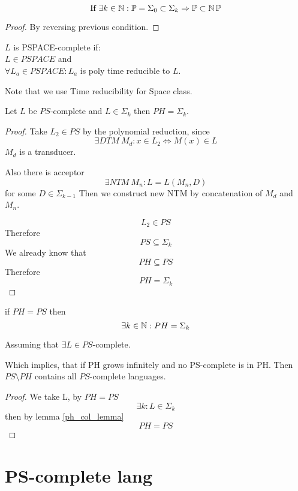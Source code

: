 \begin{consequence}
	\[ \text{If}\ \exists k \in \operatorname{\mathbb{N}}: \operatorname{\mathbb{P}} = \Sigma_0 \subset \Sigma_k \Rightarrow \operatorname{\mathbb{P}} \subset \operatorname{\operatorname{\mathbb{N}}\mathbb{P}} \]
\end{consequence}
\begin{proof}
	By reversing previous condition.
\end{proof}

\begin{definition}
	$L$ is PSPACE-complete if: \\
	$L \in PSPACE$ and\\
	$\forall L_a \in PSPACE: L_a$ is poly time reducible to $L$.

	Note that we use Time reducibility for Space class.
\end{definition}

\begin{lemma}[$PH = \Sigma_k$]\label{ph_col_lemma}
	Let $L$ be $PS$-complete and $L \in \Sigma_k$ then $PH = \Sigma_k$.
\end{lemma}
\begin{proof}
	Take $L_2 \in PS$ by the polynomial reduction, since
	\[ \exists DTM\ M_d: x \in L_2 \iff M(x) \in L \]
	$M_d$ is a transducer.

	Also there is acceptor
	\[ \exists NTM\ M_n: L = L(M_n, D) \]
	for some $D \in \Sigma_{k - 1}$
	Then we construct new NTM by concatenation of $M_d$ and $M_n$.

	\[ L_2 \in PS \]
	Therefore
	\[ PS \subseteq \Sigma_k \]
	We already know that
	\[ PH \subseteq PS \]
	Therefore
	\[ PH = \Sigma_k \]
\end{proof}

\begin{consequence}
	if $PH = PS$ then
	\[ \exists k \in \operatorname{\mathbb{N}}: PH = \Sigma_k \]

	Assuming that $\exists L \in PS$-complete.

	Which implies, that if PH grows infinitely and no PS-complete is in PH.
	Then $PS \setminus PH$ contains all $PS$-complete languages.
\end{consequence}
\begin{proof}
	We take L, by $PH = PS$
	\[ \exists k: L \in \Sigma_k \]
	then by lemma \cref{ph_col_lemma}
	\[ PH = PS \]
\end{proof}

\section{\texorpdfstring{PS-complete lang}{PS-complete lang}}
\vspace{5mm}
\large

